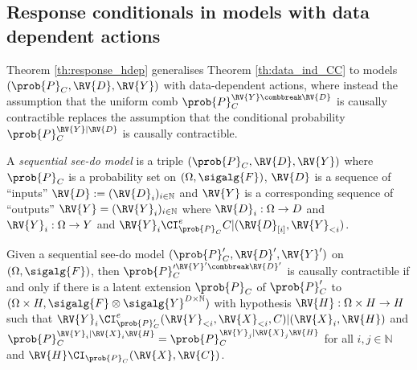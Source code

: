 \subsection{Response conditionals in models with data dependent actions}\label{sec:data_dependent_representation}

Theorem \ref{th:response_hdep} generalises Theorem \ref{th:data_ind_CC} to models $(\prob{P}_C,\RV{D},\RV{Y})$ with data-dependent actions, where instead the assumption that the uniform comb $\prob{P}_C^{\RV{Y}\combbreak \RV{D}}$ is causally contractible replaces the assumption that the conditional probability $\prob{P}_C^{\RV{Y}| \RV{D}}$ is causally contractible.

\begin{definition}
A \emph{sequential see-do model} is a triple $(\prob{P}_C,\RV{D},\RV{Y})$ where $\prob{P}_C$ is a probability set on $(\Omega,\sigalg{F})$, $\RV{D}$ is a sequence of ``inputs'' $\RV{D}:=(\RV{D}_i)_{i\in\mathbb{N}}$ and $\RV{Y}$ is a corresponding sequence of ``outputs'' $\RV{Y}=(\RV{Y}_i)_{i\in\mathbb{N}}$ where $\RV{D}_i:\Omega\to D$ and $\RV{Y}_i:\Omega\to Y$ and $\RV{Y}_i\CI^e_{\prob{P}_C} C|(\RV{D}_{[i]},\RV{Y}_{<i})$.
\end{definition}

\begin{theorem}[]\label{th:response_hdep}
Given a sequential see-do model $(\prob{P}_C',\RV{D}',\RV{Y}')$ on $(\Omega,\sigalg{F})$, then $\prob{P}_C^{\prime \RV{Y}'\combbreak \RV{D}'}$ is causally contractible if and only if there is a latent extension $\prob{P}_C$ of $\prob{P}_C'$ to $(\Omega\times H,\sigalg{F}\otimes\sigalg{Y}^{D\times\mathbb{N}})$ with hypothesis $\RV{H}:\Omega\times H\to H$ such that $\RV{Y}_i\CI^e_{\prob{P}_C'} (\RV{Y}_{<i},\RV{X}_{<i},C)|(\RV{X}_i,\RV{H})$ and $\prob{P}_C^{\RV{Y}_i|\RV{X}_i\RV{H}}=\prob{P}_C^{\RV{Y}_j|\RV{X}_j\RV{H}}$ for all $i,j\in \mathbb{N}$ and $\RV{H}\CI_{\prob{P}_C} (\RV{X},\RV{C})$.
\end{theorem}

